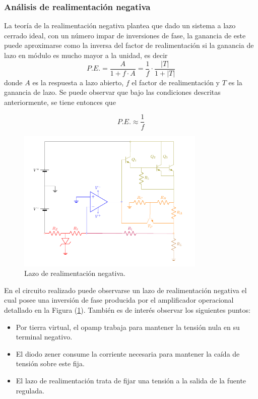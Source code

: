 \subsubsection{Análisis de realimentación negativa}
\label{sec:realimentacion-negativa}

La teoría de la realimentación negativa plantea que dado un sistema a lazo cerrado ideal, con un número impar de inversiones de fase, la ganancia de este puede aproximarse como la inversa del factor de realimentación si la ganancia de lazo en módulo es mucho mayor a la unidad, es decir
\begin{equation}
P.E. = \frac{A }{1+ f \cdot A} = \frac{1}{f} \cdot \frac{|T|}{1 + |T|}
\end{equation}
donde $A$ es la respuesta a lazo abierto, $f$ el factor de realimentación y $T$ es la ganancia de lazo. Se puede observar que bajo las condiciones descritas anteriormente, se tiene entonces que 

\begin{equation}
P.E. \approx \frac{1}{f}
\end{equation}

\begin{figure}[H]
\centering
	\includegraphics[width=0.8\textwidth, page=4]{ImagenesEjercicio2/Regulador.pdf}
	\caption{Lazo de realimentación negativa.}
	\label{fig:circuito_lazo}
\end{figure}

En el circuito realizado puede observarse un lazo de realimentación negativa el cual posee una inversión de fase producida por el amplificador operacional detallado en la Figura (\ref{fig:circuito_lazo}). También es de interés observar los siguientes puntos: 
\begin{itemize}
\item Por tierra virtual, el opamp trabaja para mantener la tensión nula en su terminal negativo.
\item El diodo zener consume la corriente necesaria para mantener la caída de tensión sobre este fija.
\item El lazo de realimentación trata de fijar una tensión a la salida de la fuente regulada.
\end{itemize}

